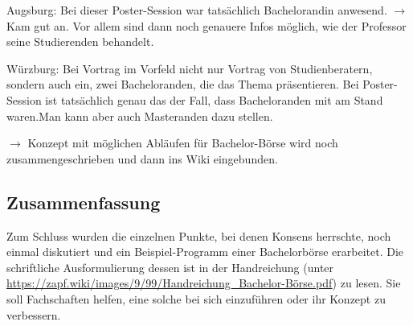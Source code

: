     Augsburg: Bei dieser Poster-Session war tatsächlich Bachelorandin anwesend. $\rightarrow$ Kam gut an. Vor allem sind dann noch genauere Infos möglich, wie der Professor seine Studierenden \flqq behandelt\frqq.

    Würzburg: Bei Vortrag im Vorfeld nicht nur Vortrag von Studienberatern, sondern auch ein, zwei Bacheloranden, die das Thema präsentieren. Bei Poster-Session ist tatsächlich genau das der Fall, dass Bacheloranden mit am Stand waren.Man kann aber auch Masteranden dazu stellen.

    $\rightarrow$ Konzept mit möglichen Abläufen für Bachelor-Börse wird noch zusammengeschrieben und dann ins Wiki eingebunden.

    \subsection*{Zusammenfassung}
      Zum Schluss wurden die einzelnen Punkte, bei denen Konsens herrschte, noch einmal diskutiert und ein Beispiel-Programm einer Bachelorbörse erarbeitet. Die schriftliche Ausformulierung dessen ist in der Handreichung (unter \url{https://zapf.wiki/images/9/99/Handreichung_Bachelor-Börse.pdf}) zu lesen. Sie soll Fachschaften helfen, eine solche bei sich einzuführen oder ihr Konzept zu verbessern.
